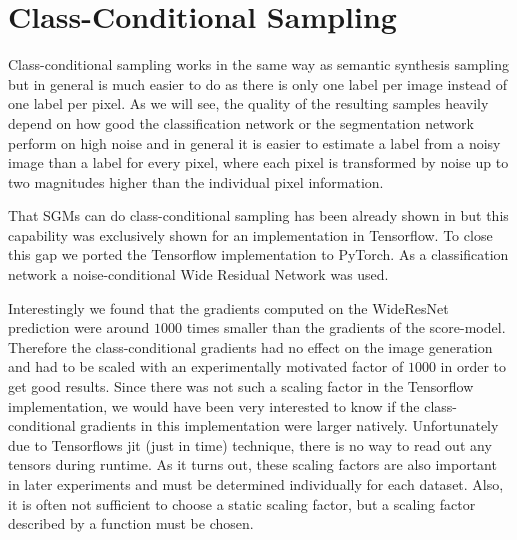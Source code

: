 

\section{Class-Conditional Sampling} \label{sec:5.1}
Class-conditional sampling works in the same way as semantic synthesis sampling but in general is much easier to do as there is only one label per image instead of one label per pixel. As we will see, the quality of the resulting samples heavily depend on how good the classification network or the segmentation network perform on high noise and in general it is easier to estimate a label from a noisy image than a label for every pixel, where each pixel is transformed by noise up to two magnitudes higher than the individual pixel information.

That SGMs can do class-conditional sampling has been already shown in \cite{score_3} but this capability was exclusively shown for an implementation in Tensorflow. To close this gap we ported the Tensorflow implementation to PyTorch. As a classification network a noise-conditional Wide Residual Network \cite{wrn} was used. 

Interestingly we found that the gradients computed on the WideResNet prediction were around $1000$ times smaller than the gradients of the score-model. Therefore the class-conditional gradients had no effect on the image generation and had to be scaled with an experimentally motivated factor of $1000$ in order to get good results. Since there was not such a scaling factor in the Tensorflow implementation, we would have been very interested to know if the class-conditional gradients in this implementation were larger natively. Unfortunately due to Tensorflows jit (just in time) technique, there is no way to read out any tensors during runtime. As it turns out, these scaling factors are also important in later experiments and must be determined individually for each dataset. Also, it is often not sufficient to choose a static scaling factor, but a scaling factor described by a function must be chosen.


